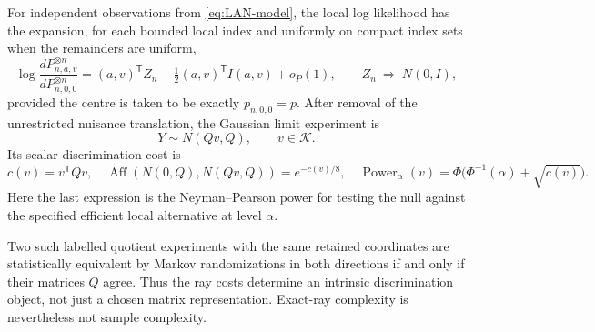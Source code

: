 \begin{theorem}\label{thm:experiment}
For independent observations from \eqref{eq:LAN-model}, the local log likelihood has the expansion, for each bounded local index and uniformly on compact index sets when the remainders are uniform,
\begin{equation}\label{eq:LAN}
 \log\frac{dP_{n,a,v}^{\otimes n}}{dP_{n,0,0}^{\otimes n}}
 =(a,v)^{\mathsf T}Z_n-\tfrac12(a,v)^{\mathsf T}I(a,v)+o_{P}(1),
 \qquad Z_n\ \Longrightarrow\ N(0,I),
\end{equation}
provided the centre is taken to be exactly $p_{n,0,0}=p$. After removal of the unrestricted nuisance translation, the Gaussian limit experiment is
\begin{equation}\label{eq:efficient-experiment}
 Y\sim N(Qv,Q),\qquad v\in\mathcal K.
\end{equation}
Its scalar discrimination cost is
\begin{equation}\label{eq:cost-affinity}
 c(v)=v^{\mathsf T}Qv,
 \quad \operatorname{Aff}(N(0,Q),N(Qv,Q))=e^{-c(v)/8},
 \quad \operatorname{Power}_{\alpha}(v)=
 \Phi\bigl(\Phi^{-1}(\alpha)+\sqrt{c(v)}\bigr).
\end{equation}
Here the last expression is the Neyman--Pearson power for testing the null against the specified efficient local alternative at level $\alpha$.

Two such labelled quotient experiments with the same retained coordinates are statistically equivalent by Markov randomizations in both directions if and only if their matrices $Q$ agree. Thus the ray costs determine an intrinsic discrimination object, not just a chosen matrix representation. Exact-ray complexity is nevertheless not sample complexity.
\end{theorem}
